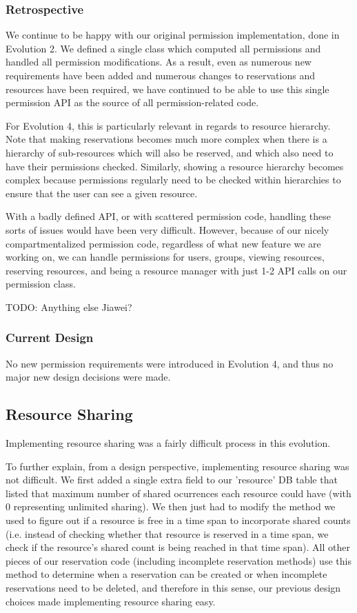 \documentclass[12pt]{article}
\begin{document}
\subsubsection{Retrospective}
We continue to be happy with our original permission implementation, done in Evolution 2. We defined a single class which computed all permissions and handled all permission modifications. As a result, even as numerous new requirements have been added and numerous changes to reservations and resources have been required, we have continued to be able to use this single permission API as the source of all permission-related code. 

For Evolution 4, this is particularly relevant in regards to resource hierarchy. Note that making reservations becomes much more complex when there is a hierarchy of sub-resources which will also be reserved, and which also need to have their permissions checked. Similarly, showing a resource hierarchy becomes complex because permissions regularly need to be checked within hierarchies to ensure that the user can see a given resource. 

With a badly defined API, or with scattered permission code, handling these sorts of issues would have been very difficult. However, because of our nicely compartmentalized permission code, regardless of what new feature we are working on, we can handle permissions for users, groups, viewing resources, reserving resources, and being a resource manager with just 1-2 API calls on our permission class. 

{\huge TODO: Anything else Jiawei?}

\subsubsection{Current Design}
No new permission requirements were introduced in Evolution 4, and thus no major new design decisions were made. 

\subsection{Resource Sharing}
Implementing resource sharing was a fairly difficult process in this evolution.

To further explain, from a design perspective, implementing resource sharing was not difficult. We first added a single extra field to our 'resource' DB table that listed that maximum number of shared ocurrences each resource could have (with 0 representing unlimited sharing). We then just had to modify the method we used to figure out if a resource is free in a time span to incorporate shared counts (i.e. instead of checking whether that resource is reserved in a time span, we check if the resource's shared count is being reached in that time span). All other pieces of our reservation code (including incomplete reservation methods) use this method to determine when a reservation can be created or when incomplete reservations need to be deleted, and therefore in this sense, our previous design choices made implementing resource sharing easy. 
\end{document}
